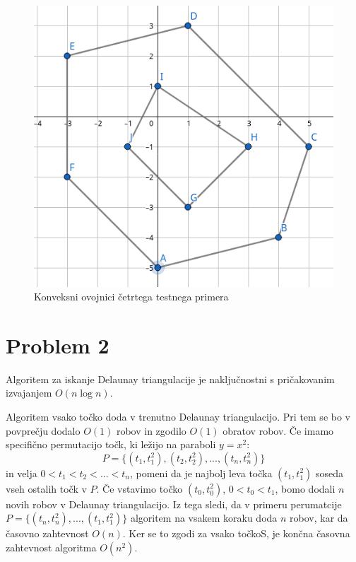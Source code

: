 \documentclass{article}
\begin{document}
\begin{figure}
	\centering
	\includegraphics[scale=0.4]{./figs/test04.png}
	\caption{Konveksni ovojnici četrtega testnega primera}
	\label{fig:test04}
\end{figure}

\section{Problem 2}

Algoritem za iskanje Delaunay triangulacije je naključnostni s pričakovanim
izvajanjem $O(n\log n)$.

Algoritem vsako točko doda v trenutno Delaunay triangulacijo. Pri tem se bo v
povprečju dodalo $O(1)$ robov in zgodilo $O(1)$ obratov robov. Če imamo
specifično permutacijo točk, ki ležijo na paraboli $y = x^2$:
\begin{equation*}
  P = \{ (t_1, t_1^2), (t_2, t_2^2), ..., (t_n, t_n^2) \}
\end{equation*}
in velja $ 0 < t_1 < t_2 < ... < t_n$, pomeni da je najbolj leva točka $(t_1,
t_1^2)$ soseda vseh ostalih točk v $P$. Če vstavimo točko $(t_0, t_0^2)$, $0 <
t_0 < t_1$, bomo dodali $n$ novih robov v Delaunay triangulacijo. Iz tega sledi,
da v primeru perumatcije $P = \{ (t_n, t_n^2), ..., (t_1, t_1^2) \}$ algoritem
na vsakem koraku doda $n$ robov, kar da časovno zahtevnost $O(n)$. Ker se to
zgodi za vsako točkoS, je končna časovna zahtevnost algoritma $O(n^2)$.
\end{document}
